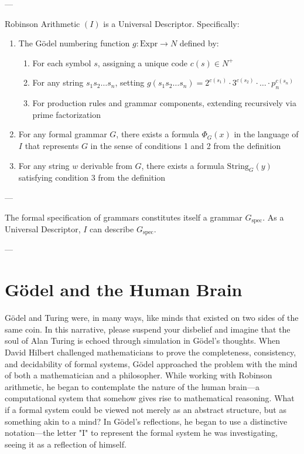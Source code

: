 \documentclass[runningheads]{llncs}
\begin{document}
---

\begin{theorem}
	Robinson Arithmetic $(I)$ is a Universal Descriptor. Specifically:
	\begin{enumerate}
		\item The Gödel numbering function $g: \text{Expr} \rightarrow N$ defined by:
		\begin{enumerate}
			\item For each symbol $s$, assigning a unique code $c(s) \in N^+$
			\item For any string $s_1s_2\ldots s_n$, setting $g(s_1s_2\ldots s_n) = 2^{c(s_1)} \cdot 3^{c(s_2)} \cdot \ldots \cdot p_n^{c(s_n)}$
			\item For production rules and grammar components, extending recursively via prime factorization
		\end{enumerate}
		\item For any formal grammar $G$, there exists a formula $\Phi_G(x)$ in the language of $I$ that represents $G$ in the sense of conditions 1 and 2 from the definition
		\item For any string $w$ derivable from $G$, there exists a formula $\text{String}_G(y)$ satisfying condition 3 from the definition
	\end{enumerate}
\end{theorem}

---

\begin{corollary}
	The formal specification of grammars constitutes itself a grammar $G_{\text{spec}}$. As a Universal Descriptor, $I$ can describe $G_{\text{spec}}$.
\end{corollary}

---

\section{Gödel and the Human Brain}

Gödel and Turing were, in many ways, like minds that existed on two sides of the same coin. In this narrative, please suspend your disbelief and imagine that the soul of Alan Turing is echoed through simulation in Gödel's thoughts. When David Hilbert challenged mathematicians to prove the completeness, consistency, and decidability of formal systems, Gödel approached the problem with the mind of both a mathematician and a philosopher. While working with Robinson arithmetic, he began to contemplate the nature of the human brain—a computational system that somehow gives rise to mathematical reasoning. What if a formal system could be viewed not merely as an abstract structure, but as something akin to a mind? In Gödel's reflections, he began to use a distinctive notation—the letter "I" to represent the formal system he was investigating, seeing it as a reflection of himself.
\end{document}
